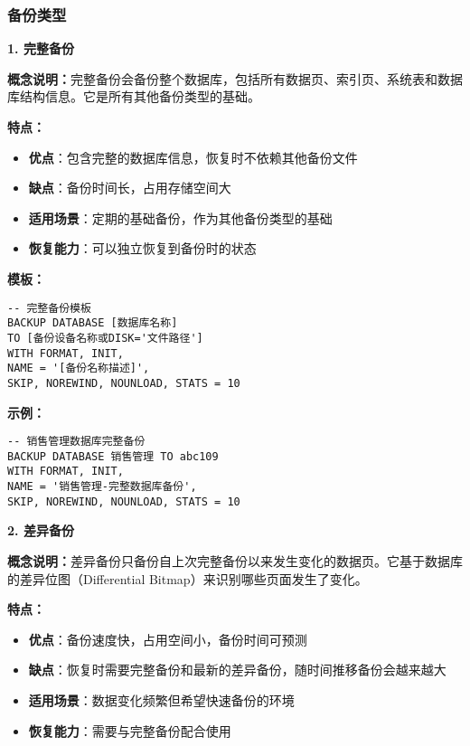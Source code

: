 \subsubsection{备份类型}

\textbf{1. 完整备份}

\qquad \textbf{概念说明：}完整备份会备份整个数据库，包括所有数据页、索引页、系统表和数据库结构信息。它是所有其他备份类型的基础。

\qquad \textbf{特点：}
\begin{itemize}
  \item \textbf{优点}：包含完整的数据库信息，恢复时不依赖其他备份文件
  \item \textbf{缺点}：备份时间长，占用存储空间大
  \item \textbf{适用场景}：定期的基础备份，作为其他备份类型的基础
  \item \textbf{恢复能力}：可以独立恢复到备份时的状态
\end{itemize}

\qquad \textbf{模板：}
\begin{mdframed}[backgroundcolor=gray!10]
\begin{verbatim}
-- 完整备份模板
BACKUP DATABASE [数据库名称]
TO [备份设备名称或DISK='文件路径']
WITH FORMAT, INIT,
NAME = '[备份名称描述]',
SKIP, NOREWIND, NOUNLOAD, STATS = 10
\end{verbatim}
\end{mdframed}

\qquad \textbf{示例：}
\begin{mdframed}[backgroundcolor=blue!5]
\begin{verbatim}
-- 销售管理数据库完整备份
BACKUP DATABASE 销售管理 TO abc109
WITH FORMAT, INIT,
NAME = '销售管理-完整数据库备份',
SKIP, NOREWIND, NOUNLOAD, STATS = 10
\end{verbatim}
\end{mdframed}

\textbf{2. 差异备份}

\qquad \textbf{概念说明：}差异备份只备份自上次完整备份以来发生变化的数据页。它基于数据库的差异位图（Differential Bitmap）来识别哪些页面发生了变化。

\qquad \textbf{特点：}
\begin{itemize}
  \item \textbf{优点}：备份速度快，占用空间小，备份时间可预测
  \item \textbf{缺点}：恢复时需要完整备份和最新的差异备份，随时间推移备份会越来越大
  \item \textbf{适用场景}：数据变化频繁但希望快速备份的环境
  \item \textbf{恢复能力}：需要与完整备份配合使用
\end{itemize}

